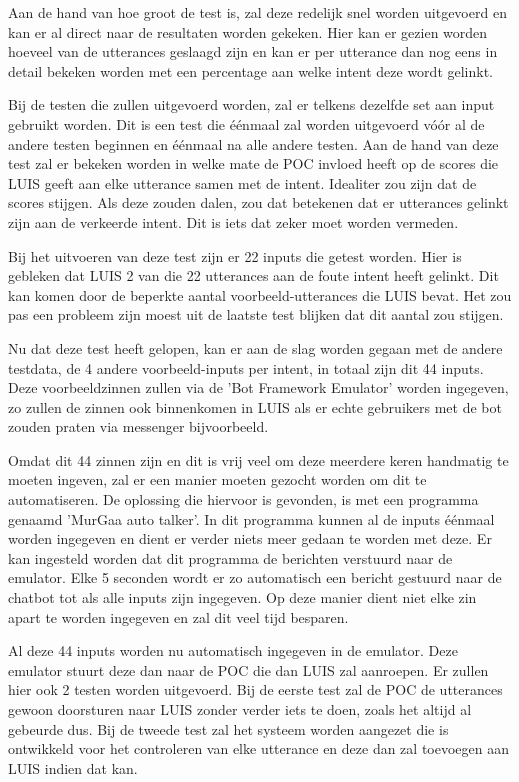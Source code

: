 Aan de hand van hoe groot de test is, zal deze redelijk snel worden uitgevoerd en kan er al direct naar de resultaten worden gekeken. Hier kan er gezien worden hoeveel van de utterances geslaagd zijn en kan er per utterance dan nog eens in detail bekeken worden met een percentage aan welke intent deze wordt gelinkt.

Bij de testen die zullen uitgevoerd worden, zal er telkens dezelfde set aan input gebruikt worden. Dit is een test die éénmaal zal worden uitgevoerd vóór al de andere testen beginnen en éénmaal na alle andere testen. Aan de hand van deze test zal er bekeken worden in welke mate de POC invloed heeft op de scores die LUIS geeft aan elke utterance samen met de intent. Idealiter zou zijn dat de scores stijgen. Als deze zouden dalen, zou dat betekenen dat er utterances gelinkt zijn aan de verkeerde intent. Dit is iets dat zeker moet worden vermeden.

Bij het uitvoeren van deze test zijn er 22 inputs die getest worden. Hier is gebleken dat LUIS 2 van die 22 utterances aan de foute intent heeft gelinkt. Dit kan komen door de beperkte aantal voorbeeld-utterances die LUIS bevat. Het zou pas een probleem zijn moest uit de laatste test blijken dat dit aantal zou stijgen.

Nu dat deze test heeft gelopen, kan er aan de slag worden gegaan met de andere testdata, de 4 andere voorbeeld-inputs per intent, in totaal zijn dit 44 inputs. Deze voorbeeldzinnen zullen via de 'Bot Framework Emulator' worden ingegeven, zo zullen de zinnen ook binnenkomen in LUIS als er echte gebruikers met de bot zouden praten via messenger bijvoorbeeld.

Omdat dit 44 zinnen zijn en dit is vrij veel om deze meerdere keren handmatig te moeten ingeven, zal er een manier moeten gezocht worden om dit te automatiseren. De oplossing die hiervoor is gevonden, is met een programma genaamd 'MurGaa auto talker'. In dit programma kunnen al de inputs éénmaal worden ingegeven en dient er verder niets meer gedaan te worden met deze. Er kan ingesteld worden dat dit programma de berichten verstuurd naar de emulator. Elke 5 seconden wordt er zo automatisch een bericht gestuurd naar de chatbot tot als alle inputs zijn ingegeven. Op deze manier dient niet elke zin apart te worden ingegeven en zal dit veel tijd besparen.

Al deze 44 inputs worden nu automatisch ingegeven in de emulator. Deze emulator stuurt deze dan naar de POC die dan LUIS zal aanroepen. Er zullen hier ook 2 testen worden uitgevoerd. Bij de eerste test zal de POC de utterances gewoon doorsturen naar LUIS zonder verder iets te doen, zoals het altijd al gebeurde dus. Bij de tweede test zal het systeem worden aangezet die is ontwikkeld voor het controleren van elke utterance en deze dan zal toevoegen aan LUIS indien dat kan.

